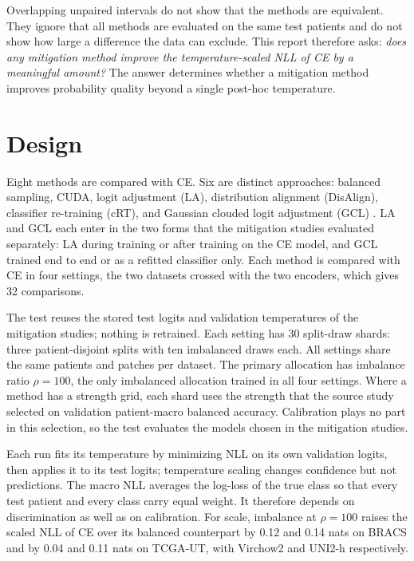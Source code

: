 \documentclass[11pt]{article}
\begin{document}
Overlapping unpaired intervals do not show that the methods are equivalent. They ignore that all methods are evaluated on the same test patients and do not show how large a difference the data can exclude. This report therefore asks: \emph{does any mitigation method improve the temperature-scaled NLL of CE by a meaningful amount?} The answer determines whether a mitigation method improves probability quality beyond a single post-hoc temperature.

\section{Design}
\label{sec:design}
Eight methods are compared with CE. Six are distinct approaches: balanced sampling, CUDA, logit adjustment (LA), distribution alignment (DisAlign), classifier re-training (cRT), and Gaussian clouded logit adjustment (GCL) \citep{queisler2026mitigationMethods}. LA and GCL each enter in the two forms that the mitigation studies evaluated separately: LA during training or after training on the CE model, and GCL trained end to end or as a refitted classifier only. Each method is compared with CE in four settings, the two datasets crossed with the two encoders, which gives 32 comparisons.

The test reuses the stored test logits and validation temperatures of the mitigation studies; nothing is retrained. Each setting has 30 split-draw shards: three patient-disjoint splits with ten imbalanced draws each. All settings share the same patients and patches per dataset. The primary allocation has imbalance ratio $\rho=100$, the only imbalanced allocation trained in all four settings. Where a method has a strength grid, each shard uses the strength that the source study selected on validation patient-macro balanced accuracy. Calibration plays no part in this selection, so the test evaluates the models chosen in the mitigation studies.

Each run fits its temperature by minimizing NLL on its own validation logits, then applies it to its test logits; temperature scaling changes confidence but not predictions. The macro NLL averages the log-loss of the true class so that every test patient and every class carry equal weight. It therefore depends on discrimination as well as on calibration. For scale, imbalance at $\rho=100$ raises the scaled NLL of CE over its balanced counterpart by 0.12 and 0.14 nats on BRACS and by 0.04 and 0.11 nats on TCGA-UT, with Virchow2 and UNI2-h respectively.
\end{document}
